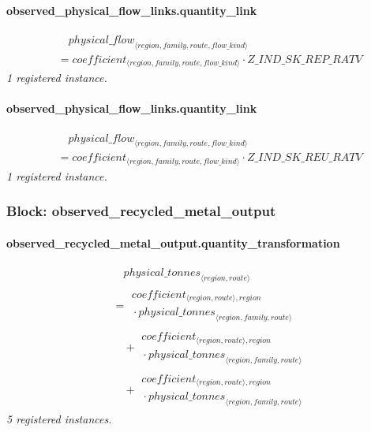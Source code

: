 \documentclass[11pt]{article}
\begin{document}
\paragraph{observed\_physical\_flow\_links.quantity\_link}
\begin{align*}
&\quad {physical\_flow}_{\langle region, family, route, flow\_kind\rangle}\\
&= coefficient_{\langle region, family, route, flow\_kind\rangle} \cdot Z\_IND\_SK\_REP\_RATV
\end{align*}
\noindent\emph{1 registered instance.}\par
\paragraph{observed\_physical\_flow\_links.quantity\_link}
\begin{align*}
&\quad {physical\_flow}_{\langle region, family, route, flow\_kind\rangle}\\
&= coefficient_{\langle region, family, route, flow\_kind\rangle} \cdot Z\_IND\_SK\_REU\_RATV
\end{align*}
\noindent\emph{1 registered instance.}\par
\subsubsection*{Block: observed\_recycled\_metal\_output}
\paragraph{observed\_recycled\_metal\_output.quantity\_transformation}
\begin{align*}
&\quad {physical\_tonnes}_{\langle region, route\rangle}\\
&= \begin{aligned}
coefficient_{\langle region, route\rangle,region}\\
{}\cdot {physical\_tonnes}_{\langle region, family, route\rangle}
\end{aligned}\\
&\quad {}+ \begin{aligned}
coefficient_{\langle region, route\rangle,region}\\
{}\cdot {physical\_tonnes}_{\langle region, family, route\rangle}
\end{aligned}\\
&\quad {}+ \begin{aligned}
coefficient_{\langle region, route\rangle,region}\\
{}\cdot {physical\_tonnes}_{\langle region, family, route\rangle}
\end{aligned}
\end{align*}
\noindent\emph{5 registered instances.}\par
\end{document}
